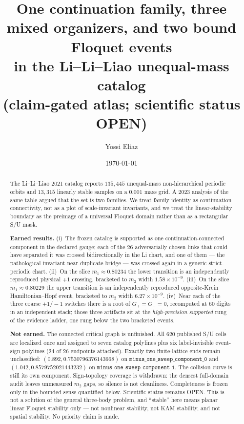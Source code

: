 \documentclass[11pt]{article}
\title{One continuation family, three mixed organizers, and two bound Floquet events\\
in the Li--Li--Liao unequal-mass catalog\\
\large (claim-gated atlas; scientific status OPEN)}
\author{Yossi Eliaz}
\date{\today}
\begin{document}
\maketitle

\begin{abstract}
The Li--Li--Liao 2021 catalog reports $135{,}445$ unequal-mass non-hierarchical
periodic orbits and $13{,}315$ linearly stable samples on a $0.001$ mass grid.
A 2023 analysis of the same table argued that the set is two families.
We treat family identity as continuation connectivity, not as a plot of
scale-invariant invariants, and we treat the linear-stability boundary as the
preimage of a universal Floquet domain rather than as a rectangular S/U mask.

\textbf{Earned results.}
(i)~The frozen catalog is supported as one continuation-connected component in
the declared gauge; each of the $26$ adversarially chosen links that could have
separated it was crossed bidirectionally in the Li chart, and one of them --- the
pathological invariant-near-duplicate bridge --- was crossed again in a generic
strict-periodic chart.
(ii)~On the slice $m_1\approx0.80234$ the lower transition is an independently
reproduced physical $+1$ crossing, bracketed to $m_2$ width
$1.58\times10^{-9}$.
(iii)~On the slice $m_1\approx0.80229$ the upper transition is an independently
reproduced opposite-Krein Hamiltonian--Hopf event, bracketed to $m_2$ width
$6.27\times10^{-9}$.
(iv)~Near each of the three coarse $+1/-1$ switches there is a root of
$G_+=G_-=0$, recomputed at $60$ digits in an independent stack; those three
artifacts sit at the \emph{high-precision supported} rung of the evidence
ladder, one rung below the two bracketed events.

\textbf{Not earned.}
The connected critical graph is unfinished.
All $620$ published S/U cells are localized once and assigned to seven catalog
polylines plus six label-invisible event-sign polylines ($24$ of $26$
endpoints attached).
Exactly two finite-lattice ends remain unclassified:
$(0.892,0.7530796376143668)$ on $\texttt{minus\_one\_sweep\_component\_0}$
and $(1.042,0.8579752021443232)$ on $\texttt{minus\_one\_sweep\_component\_1}$.
The collision curve is still its own component.
Sign-topology coverage is withdrawn: the densest full-domain audit leaves
unmeasured $m_2$ gaps, so silence is not cleanliness.
Completeness is frozen only in the bounded sense quantified below.
Scientific status remains OPEN.
This is not a solution of the general three-body problem, and ``stable'' here
means planar linear Floquet stability only --- not nonlinear stability, not
KAM stability, and not spatial stability.
No priority claim is made.
\end{abstract}
\end{document}
